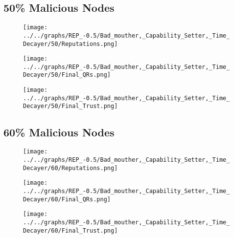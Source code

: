\begin{minipage}[t]{0.49\columnwidth}
\subsection*{50\% Malicious Nodes}
    \begin{figure}[H]
        \centering
        \texttt{[image: ../../graphs/REP\_-0.5/Bad\_mouther,\_Capability\_Setter,\_Time\_Decayer/50/Reputations.png]}
    \end{figure}
    \begin{figure}[H]
        \centering
        \texttt{[image: ../../graphs/REP\_-0.5/Bad\_mouther,\_Capability\_Setter,\_Time\_Decayer/50/Final\_QRs.png]}
    \end{figure}
\end{minipage}
\begin{minipage}[t]{0.49\columnwidth}
    \begin{figure}[H]
        \centering
        \texttt{[image: ../../graphs/REP\_-0.5/Bad\_mouther,\_Capability\_Setter,\_Time\_Decayer/50/Final\_Trust.png]}
    \end{figure}
\end{minipage}

\begin{minipage}[t]{0.49\columnwidth}
\subsection*{60\% Malicious Nodes}
    \begin{figure}[H]
        \centering
        \texttt{[image: ../../graphs/REP\_-0.5/Bad\_mouther,\_Capability\_Setter,\_Time\_Decayer/60/Reputations.png]}
    \end{figure}
    \begin{figure}[H]
        \centering
        \texttt{[image: ../../graphs/REP\_-0.5/Bad\_mouther,\_Capability\_Setter,\_Time\_Decayer/60/Final\_QRs.png]}
    \end{figure}
\end{minipage}
\begin{minipage}[t]{0.49\columnwidth}
    \begin{figure}[H]
        \centering
        \texttt{[image: ../../graphs/REP\_-0.5/Bad\_mouther,\_Capability\_Setter,\_Time\_Decayer/60/Final\_Trust.png]}
    \end{figure}
\end{minipage}
\newpage

